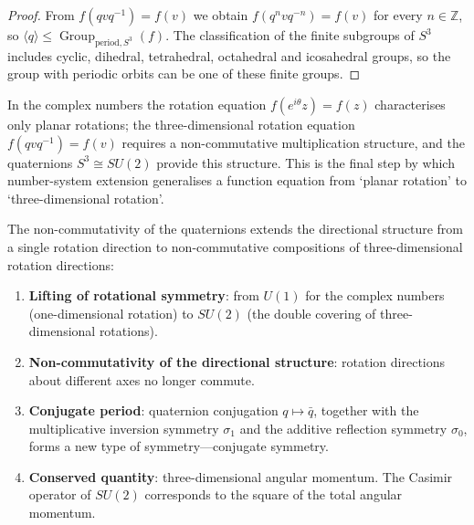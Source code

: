 \begin{proof}
From $f(qvq^{-1})=f(v)$ we obtain $f(q^n v q^{-n})=f(v)$ for every $n\in\mathbb{Z}$, so $\langle q\rangle\le\operatorname{Group}_{\mathrm{period},S^3}(f)$. The classification of the finite subgroups of $S^3$ includes cyclic, dihedral, tetrahedral, octahedral and icosahedral groups, so the group with periodic orbits can be one of these finite groups.
\end{proof}

\begin{remark}\label{rem:quaternion_makes_rotation_algebraic}
In the complex numbers the rotation equation $f(e^{i\theta}z)=f(z)$ characterises only planar rotations; the three-dimensional rotation equation $f(qvq^{-1})=f(v)$ requires a non-commutative multiplication structure, and the quaternions $S^3\cong SU(2)$ provide this structure. This is the final step by which number-system extension generalises a function equation from `planar rotation' to `three-dimensional rotation'.
\end{remark}

\begin{proposition}\label{prop:quaternion_direction_period}
The non-commutativity of the quaternions extends the directional structure from a single rotation direction to non-commutative compositions of three-dimensional rotation directions:
\begin{enumerate}[label=(\roman*)]
    \item \textbf{Lifting of rotational symmetry}: from $U(1)$ for the complex numbers (one-dimensional rotation) to $SU(2)$ (the double covering of three-dimensional rotations).
    \item \textbf{Non-commutativity of the directional structure}: rotation directions about different axes no longer commute.
    \item \textbf{Conjugate period}: quaternion conjugation $q \mapsto \bar{q}$, together with the multiplicative inversion symmetry $\sigma_1$ and the additive reflection symmetry $\sigma_0$, forms a new type of symmetry---conjugate symmetry.
    \item \textbf{Conserved quantity}: three-dimensional angular momentum. The Casimir operator of $SU(2)$ corresponds to the square of the total angular momentum.
\end{enumerate}
\end{proposition}

